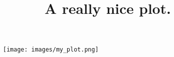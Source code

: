 \documentclass[a4paper,11pt]{article}
\title{\textbf{A really nice plot.}}
\begin{document}
\maketitle


\begin{figure}
\texttt{[image: images/my\_plot.png]}
\end{figure}
\end{document}
